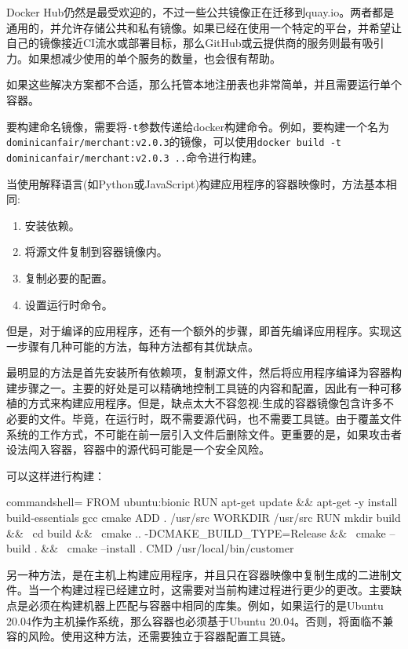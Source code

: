 Docker Hub仍然是最受欢迎的，不过一些公共镜像正在迁移到quay.io。两者都是通用的，并允许存储公共和私有镜像。如果已经在使用一个特定的平台，并希望让自己的镜像接近CI流水或部署目标，那么GitHub或云提供商的服务则最有吸引力。如果想减少使用的单个服务的数量，也会很有帮助。

如果这些解决方案都不合适，那么托管本地注册表也非常简单，并且需要运行单个容器。

要构建命名镜像，需要将\texttt{-t}参数传递给docker构建命令。例如，要构建一个名为\texttt{dominicanfair/merchant:v2.0.3}的镜像，可以使用\texttt{docker build -t dominicanfair/merchant:v2.0.3 ..}命令进行构建。


当使用解释语言(如Python或JavaScript)构建应用程序的容器映像时，方法基本相同:

\begin{enumerate}
\item 
安装依赖。

\item 
将源文件复制到容器镜像内。

\item 
复制必要的配置。

\item 
设置运行时命令。
\end{enumerate}

但是，对于编译的应用程序，还有一个额外的步骤，即首先编译应用程序。实现这一步骤有几种可能的方法，每种方法都有其优缺点。

最明显的方法是首先安装所有依赖项，复制源文件，然后将应用程序编译为容器构建步骤之一。主要的好处是可以精确地控制工具链的内容和配置，因此有一种可移植的方式来构建应用程序。但是，缺点太大不容忽视:生成的容器镜像包含许多不必要的文件。毕竟，在运行时，既不需要源代码，也不需要工具链。由于覆盖文件系统的工作方式，不可能在前一层引入文件后删除文件。更重要的是，如果攻击者设法闯入容器，容器中的源代码可能是一个安全风险。

可以这样进行构建：

\begin{tcblisting}{commandshell={}}
FROM ubuntu:bionic
RUN apt-get update && apt-get -y install build-essentials gcc cmake
ADD . /usr/src
WORKDIR /usr/src
RUN mkdir build && \
    cd build && \
    cmake .. -DCMAKE_BUILD_TYPE=Release && \
    cmake --build . && \
    cmake --install .
CMD /usr/local/bin/customer
\end{tcblisting}

另一种方法，是在主机上构建应用程序，并且只在容器映像中复制生成的二进制文件。当一个构建过程已经建立时，这需要对当前构建过程进行更少的更改。主要缺点是必须在构建机器上匹配与容器中相同的库集。例如，如果运行的是Ubuntu 20.04作为主机操作系统，那么容器也必须基于Ubuntu 20.04。否则，将面临不兼容的风险。使用这种方法，还需要独立于容器配置工具链。

